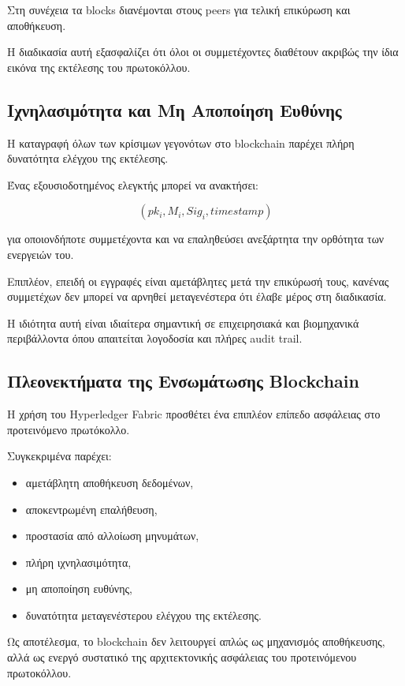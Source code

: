 \documentclass[12pt,a4paper]{report}
\begin{document}
Στη συνέχεια τα blocks διανέμονται στους peers για τελική επικύρωση και αποθήκευση.

Η διαδικασία αυτή εξασφαλίζει ότι όλοι οι συμμετέχοντες διαθέτουν ακριβώς την ίδια εικόνα της εκτέλεσης του πρωτοκόλλου.

\subsection{Ιχνηλασιμότητα και Μη Αποποίηση Ευθύνης}

Η καταγραφή όλων των κρίσιμων γεγονότων στο blockchain παρέχει πλήρη δυνατότητα ελέγχου της εκτέλεσης.

Ένας εξουσιοδοτημένος ελεγκτής μπορεί να ανακτήσει:

\[
(pk_i,M_i,Sig_i,timestamp)
\]

για οποιονδήποτε συμμετέχοντα και να επαληθεύσει ανεξάρτητα την ορθότητα των ενεργειών του.

Επιπλέον, επειδή οι εγγραφές είναι αμετάβλητες μετά την επικύρωσή τους, κανένας συμμετέχων δεν μπορεί να αρνηθεί μεταγενέστερα ότι έλαβε μέρος στη διαδικασία.

Η ιδιότητα αυτή είναι ιδιαίτερα σημαντική σε επιχειρησιακά και βιομηχανικά περιβάλλοντα όπου απαιτείται λογοδοσία και πλήρες audit trail.

\subsection{Πλεονεκτήματα της Ενσωμάτωσης Blockchain}

Η χρήση του Hyperledger Fabric προσθέτει ένα επιπλέον επίπεδο ασφάλειας στο προτεινόμενο πρωτόκολλο.

Συγκεκριμένα παρέχει:

\begin{itemize}
\item αμετάβλητη αποθήκευση δεδομένων,
\item αποκεντρωμένη επαλήθευση,
\item προστασία από αλλοίωση μηνυμάτων,
\item πλήρη ιχνηλασιμότητα,
\item μη αποποίηση ευθύνης,
\item δυνατότητα μεταγενέστερου ελέγχου της εκτέλεσης.
\end{itemize}

Ως αποτέλεσμα, το blockchain δεν λειτουργεί απλώς ως μηχανισμός αποθήκευσης, αλλά ως ενεργό συστατικό της αρχιτεκτονικής ασφάλειας του προτεινόμενου πρωτοκόλλου.
\end{document}
